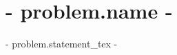 \documentclass[11pt]{article}
\begin{document}
\section*{ {{- problem.name -}} }

{{- problem.statement_tex -}}
\end{document}

